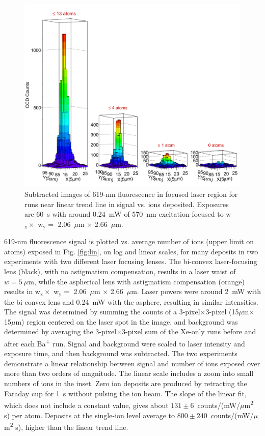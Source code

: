 \begin{figure} %
        \centering
                \includegraphics[width=.99\textwidth]{figures/train.png}
                \caption{Subtracted images of 619-nm fluorescence in focused laser region for runs near linear trend line in signal vs. ions deposited.  Exposures are 60~s with around 0.24~mW of 570~nm excitation focused to w$_{\text{x}} \times$ w$_{\text{y}} =$ 2.06~$\mu$m $\times$ 2.66~$\mu$m.}
\label{fig:train}
\end{figure}

619-nm fluorescence signal is plotted vs. average number of ions (upper limit on atoms) exposed in Fig. \ref{fig:lin}, on log and linear scales, for many deposits in two experiments with two different laser focusing lenses.  The bi-convex laser-focusing lens (black), with no astigmatism compensation, results in a laser waist of $w = 5~\mu$m, while the aspherical lens with astigmatism compensation (orange) results in w$_{\text{x}} \times$ w$_{\text{y}} =$ 2.06~$\mu$m $\times$ 2.66~$\mu$m.  Laser powers were around 2~mW with the bi-convex lens and 0.24~mW with the asphere, resulting in similar intensities.  The signal was determined by summing the counts of a 3-pixel$\times$3-pixel (15$\mu$m$\times$15$\mu$m) region centered on the laser spot in the image, and background was determined by averaging the 3-pixel$\times$3-pixel sum of the Xe-only runs before and after each Ba\textsuperscript{+} run.  Signal and background were scaled to laser intensity and exposure time, and then background was subtracted.  The two experiments demonstrate a linear relationship between signal and number of ions exposed over more than two orders of magnitude.  The linear scale includes a zoom into small numbers of ions in the inset.  Zero ion deposits are produced by retracting the Faraday cup for 1~s without pulsing the ion beam.  The slope of the linear fit, which does not include a constant value, gives about $131 \pm 6$~counts/(mW/$\mu$m\textsuperscript{2} s) per atom.  Deposits at the single-ion level average to $800 \pm 240$~counts/(mW/$\mu$m\textsuperscript{2} s), higher than the linear trend line.

